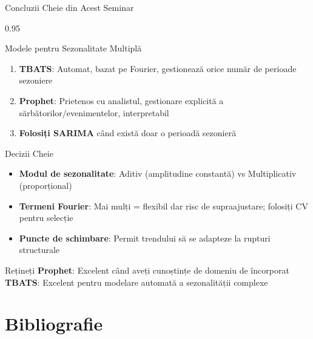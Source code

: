 \documentclass[9pt, aspectratio=169, t]{beamer}
\begin{document}
\begin{frame}{Concluzii Cheie din Acest Seminar}
    \begin{cminipage}{0.95\textwidth}
    {\footnotesize
    \begin{block}{Modele pentru Sezonalitate Multiplă}
        \begin{enumerate}\setlength{\itemsep}{0pt}
            \item \textbf{TBATS}: Automat, bazat pe Fourier, gestionează orice număr de perioade sezoniere
            \item \textbf{Prophet}: Prietenos cu analistul, gestionare explicită a sărbătorilor/evenimentelor, interpretabil
            \item \textbf{Folosiți SARIMA} când există doar o perioadă sezonieră
        \end{enumerate}
    \end{block}
    \begin{block}{Decizii Cheie}
        \begin{itemize}\setlength{\itemsep}{0pt}
            \item \textbf{Modul de sezonalitate}: Aditiv (amplitudine constantă) vs Multiplicativ (proporțional)
            \item \textbf{Termeni Fourier}: Mai mulți = flexibil dar risc de supraajustare; folosiți CV pentru selecție
            \item \textbf{Puncte de schimbare}: Permit trendului să se adapteze la rupturi structurale
        \end{itemize}
    \end{block}
    \begin{alertblock}{Rețineți}
        \textbf{Prophet}: Excelent când aveți cunoștințe de domeniu de încorporat \\
        \textbf{TBATS}: Excelent pentru modelare automată a sezonalității complexe
    \end{alertblock}
    }
    \end{cminipage}
\end{frame}
\section{Bibliografie}
\end{document}
